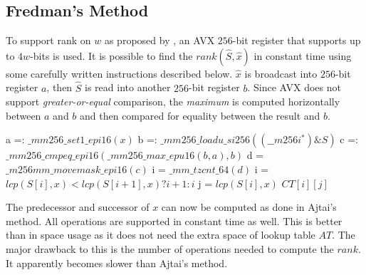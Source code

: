 \subsection{Fredman's Method} 
To support rank on $w$ as proposed by \cite{FREDMAN1993424}, an AVX $256$-bit register that supports up to $4w$-bits is used. It is possible to find the $rank(\hat{S}, \hat{x})$ in constant time using some carefully written instructions described below. $\hat{x}$ is broadcast into $256$-bit register $a$, then $\hat{S}$ is read into another $256$-bit register $b$. Since AVX does not support \textit{greater-or-equal} comparison, the \textit{maximum} is computed horizontally between $a$ and $b$ and then compared for equality between the result and $b$. 
\begin{table}[ht]
    \centering
    \begin{minipage}[t]{1\textwidth}
        \centering
        \begin{algorithm}[H]
            \caption{rankFW(S, x)}
            \begin{algorithmic}[1]
                \STATE a =: $\_mm256\_set1\_epi16(x)$
                \STATE b =: $\_mm256\_loadu\_si256((\_\_m256i^*)\&S)$
                \STATE c =: $\_mm256\_cmpeq\_epi16(\_mm256\_max\_epu16(b, a), b)$
                \STATE d = $\_m256mm\_movemask\_epi16(c)$
                \STATE i = $\_mm\_tzcnt\_64(d)$
                \STATE i = $lcp(S[i], x) < lcp(S[i + 1], x) ? i + 1 : i$
                \STATE j = $lcp(S[i], x)$
                \RETURN $CT[i][j]$
            \end{algorithmic}
        \end{algorithm}
    \end{minipage}%
\end{table}
The predecessor and successor of $x$ can now be computed as done in Ajtai's method. All operations are supported in constant time as well. This is better than \cite{AJTAI1984217} in space usage as it does not need the extra space of lookup table $AT$.  The major drawback to this is the number of operations needed to compute the $rank$. It apparently becomes slower than Ajtai's method.\par
